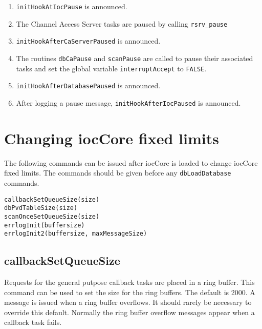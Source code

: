 \begin{enumerate}\item \verb|initHookAtIocPause| is announced.

\item The Channel Access Server tasks are paused by calling \verb|rsrv_pause|

\item \verb|initHookAfterCaServerPaused| is announced.

\item The routines \verb|dbCaPause| and \verb|scanPause| are called to pause their associated tasks and set the global variable 
\verb|interruptAccept| to \verb|FALSE|.

\item \verb|initHookAfterDatabasePaused| is announced.

\item After logging a pause message, \verb|initHookAfterIocPaused| is announced.

\end{enumerate}
\section{Changing iocCore fixed limits}

The following commands can be issued after iocCore is loaded to change iocCore fixed limits. The commands should be 
given before any \verb|dbLoadDatabase| commands.

\begin{verbatim}callbackSetQueueSize(size)
dbPvdTableSize(size)
scanOnceSetQueueSize(size)
errlogInit(buffersize)
errlogInit2(buffersize, maxMessageSize)
\end{verbatim}
\subsection{callbackSetQueueSize}

Requests for the general putpose callback tasks are placed in a ring buffer. This command can be used to set the size for 
the ring buffers. The default is 2000. A message is issued when a ring buffer overflows. It should rarely be necessary to 
override this default. Normally the ring buffer overflow messages appear when a callback task fails.

